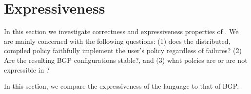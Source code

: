 \section{Expressiveness}

In this section we investigate correctness and expressiveness properties of \sysname. We are mainly concerned with the following questions: (1) does the distributed, compiled policy faithfully implement the user's policy regardless of failures? (2) Are the resulting BGP configurations stable?, and (3) what polcies are or are not expressible in \sysname?


In this section, we compare the expressiveness of the \sysname language to that of BGP.

